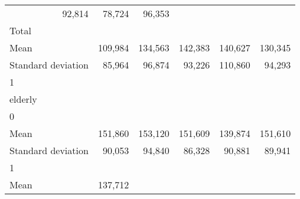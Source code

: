 \begin{tabular}{llllll}
  \multicolumn{1}{r}{92,814} &
  \multicolumn{1}{r}{78,724} &
  \multicolumn{1}{r}{96,353} \\
\multicolumn{1}{l}{\hspace{3em}Total} &
  \multicolumn{1}{|r}{} &
  \multicolumn{1}{r}{} &
  \multicolumn{1}{r}{} &
  \multicolumn{1}{r}{} &
  \multicolumn{1}{r}{} \\
\multicolumn{1}{l}{\hspace{4em}Mean} &
  \multicolumn{1}{|r}{109,984} &
  \multicolumn{1}{r}{134,563} &
  \multicolumn{1}{r}{142,383} &
  \multicolumn{1}{r}{140,627} &
  \multicolumn{1}{r}{130,345} \\
\multicolumn{1}{l}{\hspace{4em}Standard deviation} &
  \multicolumn{1}{|r}{85,964} &
  \multicolumn{1}{r}{96,874} &
  \multicolumn{1}{r}{93,226} &
  \multicolumn{1}{r}{110,860} &
  \multicolumn{1}{r}{94,293} \\
\multicolumn{1}{l}{\hspace{1em}1} &
  \multicolumn{1}{|r}{} &
  \multicolumn{1}{r}{} &
  \multicolumn{1}{r}{} &
  \multicolumn{1}{r}{} &
  \multicolumn{1}{r}{} \\
\multicolumn{1}{l}{\hspace{2em}elderly} &
  \multicolumn{1}{|r}{} &
  \multicolumn{1}{r}{} &
  \multicolumn{1}{r}{} &
  \multicolumn{1}{r}{} &
  \multicolumn{1}{r}{} \\
\multicolumn{1}{l}{\hspace{3em}0} &
  \multicolumn{1}{|r}{} &
  \multicolumn{1}{r}{} &
  \multicolumn{1}{r}{} &
  \multicolumn{1}{r}{} &
  \multicolumn{1}{r}{} \\
\multicolumn{1}{l}{\hspace{4em}Mean} &
  \multicolumn{1}{|r}{151,860} &
  \multicolumn{1}{r}{153,120} &
  \multicolumn{1}{r}{151,609} &
  \multicolumn{1}{r}{139,874} &
  \multicolumn{1}{r}{151,610} \\
\multicolumn{1}{l}{\hspace{4em}Standard deviation} &
  \multicolumn{1}{|r}{90,053} &
  \multicolumn{1}{r}{94,840} &
  \multicolumn{1}{r}{86,328} &
  \multicolumn{1}{r}{90,881} &
  \multicolumn{1}{r}{89,941} \\
\multicolumn{1}{l}{\hspace{3em}1} &
  \multicolumn{1}{|r}{} &
  \multicolumn{1}{r}{} &
  \multicolumn{1}{r}{} &
  \multicolumn{1}{r}{} &
  \multicolumn{1}{r}{} \\
\multicolumn{1}{l}{\hspace{4em}Mean} &
  \multicolumn{1}{|r}{137,712} &

\end{tabular}
